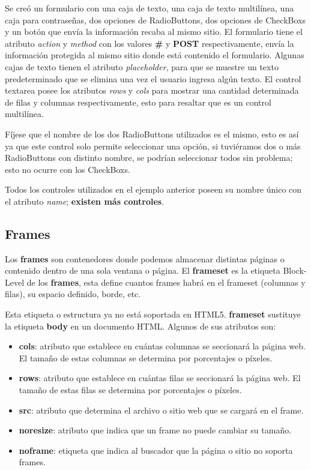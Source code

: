 Se creó un formulario con una caja de texto, una caja de texto multilínea, una caja para contraseñas, dos opciones de RadioButtons, dos opciones de CheckBoxs y un botón que envía la información recaba al mismo sitio. El formulario tiene el atributo \textit{action} y \textit{method} con los valores \textbf{\#} y \textbf{POST} respectivamente, envía la información protegida al mismo sitio donde está contenido el formulario. Algunas cajas de texto tienen el atributo \textit{placeholder}, para que se muestre un texto predeterminado que se elimina una vez el usuario ingresa algún texto. El control textarea posee los atributos \textit{rows} y \textit{cols} para mostrar una cantidad determinada de filas y columnas respectivamente, esto para resaltar que es un control multilínea.

Fíjese que el nombre de los dos RadioButtons utilizados es el mismo, esto es así ya que este control solo permite seleccionar una opción, si tuviéramos dos o más RadioButtons con distinto nombre, se podrían seleccionar todos sin problema; esto no ocurre con los CheckBoxs.

Todos los controles utilizados en el ejemplo anterior poseen su nombre único con el atributo \textit{name}; \textbf{existen más controles}.


\subsection{Frames}
\hspace{0.55cm}Los \textbf{frames} son contenedores donde podemos almacenar distintas páginas o contenido dentro de una sola ventana o página. El \textbf{frameset} es la etiqueta Block-Level de los \textbf{frames}, esta define cuantos frames habrá en el frameset (columnas y filas), su espacio definido, borde, etc.

Esta etiqueta o estructura ya no está soportada en HTML5. \textbf{frameset} sustituye la etiqueta \textbf{body} en un documento HTML. Algunos de sus atributos son:
\begin{itemize}
    \item \textbf{cols}: atributo que establece en cuántas columnas se seccionará la página web. El tamaño de estas columnas se determina por porcentajes o píxeles.
    \item \textbf{rows}: atributo que establece en cuántas filas se seccionará la página web. El tamaño de estas filas se determina por porcentajes o píxeles.
    \item \textbf{src}: atributo que determina el archivo o sitio web que se cargará en el frame.
    \item \textbf{noresize}: atributo que indica que un frame no puede cambiar su tamaño.
    \item \textbf{noframe}: etiqueta que indica al buscador que la página o sitio no soporta frames.
\end{itemize}

